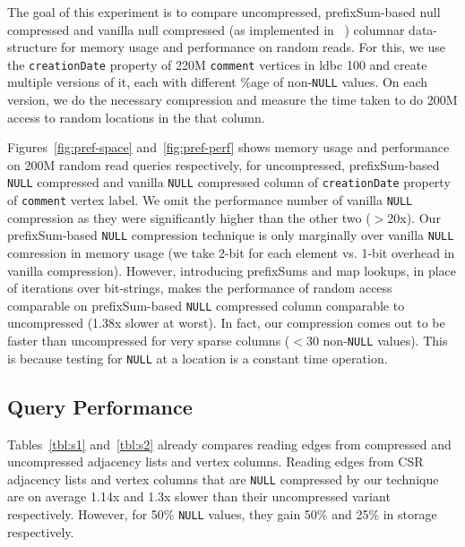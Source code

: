The goal of this experiment is to compare uncompressed, prefixSum-based null compressed and vanilla null compressed (as implemented in ~\cite{abadi-sparse-col}) columnar data-structure for memory usage and performance on random reads. For this, we use the \texttt{creationDate} property of 220M \texttt{comment} vertices in \gls{ldbc} 100 and create multiple versions of it, each with different \%age of non-\texttt{NULL} values. On each version, we do the necessary compression and measure the time taken to do 200M access to random locations in the that column. 

Figures~\ref{fig:pref-space} and~\ref{fig:pref-perf} shows memory usage and performance on 200M random read queries respectively, for uncompressed, prefixSum-based \texttt{NULL} compressed and vanilla \texttt{NULL} compressed column of \texttt{creationDate} property of \texttt{comment} vertex label. We omit the performance number of vanilla \texttt{NULL} compression as they were significantly higher than the other two ($>$20x). Our prefixSum-based \texttt{NULL} compression technique is only marginally over vanilla \texttt{NULL} comression in memory usage (we take 2-bit for each element vs. 1-bit overhead in vanilla compression). However, introducing prefixSums and map lookups, in place of iterations over bit-strings, makes the performance of random access comparable on prefixSum-based \texttt{NULL} compressed column comparable to uncompressed (1.38x slower at worst). In fact, our compression comes out to be faster than uncompressed for very sparse columns ($<30$ non-\texttt{NULL} values). This is because testing for \texttt{NULL} at a location is a constant time operation.

\subsection{Query Performance}

Tables~\ref{tbl:s1} and~\ref{tbl:s2} already compares reading edges from compressed and uncompressed adjacency lists and vertex columns. Reading edges from CSR adjacency lists and vertex columns that are \texttt{NULL} compressed by our technique are on average 1.14x and 1.3x slower than their uncompressed variant respectively. However, for 50\% \texttt{NULL} values, they gain 50\% and 25\% in storage respectively. 

